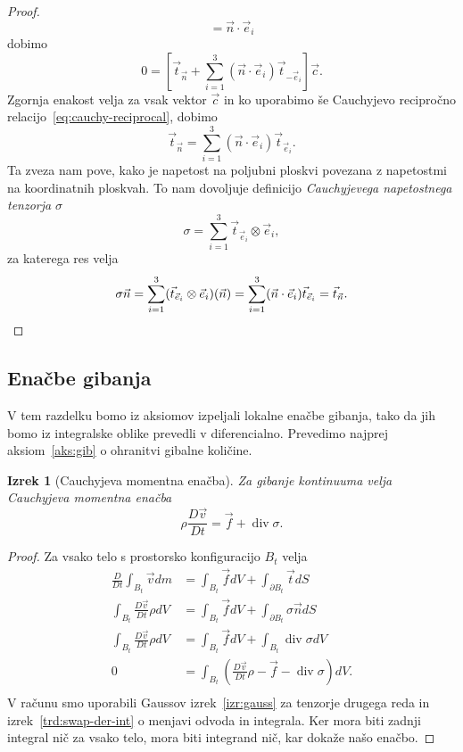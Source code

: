 \documentclass[12pt,a4paper,twoside]{article}
\theoremstyle{definition} %
\theoremstyle{plain} %
\newtheorem{izrek}[definicija]{Izrek}
\numberwithin{equation}{section}
\renewcommand{\div}{\operatorname{div}}
\newcommand{\DD}[2]{\ensuremath{\frac{D #1}{D #2}}}
\newcommand{\DDt}[1]{\DD{#1}{t}}
\newcommand{\vv}{\vec{v}}
\newcommand{\vt}{\vec{t}}
\newcommand{\vc}{\vec{c}}
\newcommand{\vn}{\vec{n}}
\newcommand{\vf}{\vec{f}}
\newcommand{\ts}{\sigma}
\begin{document}
\begin{proof}
\[  = \vn\cdot\vec{e}_i
\]
dobimo
\[
  0 = \left[\vt_{\vn} + \sum_{i=1}^3 (\vn \cdot\vec{e}_i) \vt_{-\vec{e}_i}\right]\vc.
\]
Zgornja enakost velja za vsak vektor $\vc$ in ko uporabimo še Cauchyjevo recipročno
relacijo~\eqref{eq:cauchy-reciprocal}, dobimo
\[
  \vt_{\vn} = \sum_{i=1}^3 (\vn \cdot\vec{e}_i) \vt_{\vec{e}_i}.
\]
Ta zveza nam pove, kako je napetost na poljubni ploskvi povezana z napetostmi na
koordinatnih ploskvah.
To nam dovoljuje definicijo \emph{Cauchyjevega napetostnega tenzorja}
$\ts$
\[
  \ts = \sum_{i=1}^3 \vt_{\vec{e}_i}\otimes \vec{e}_i,
\]
za katerega res velja
\[
  \ts\vn = \sum_{i=1}^3 (\vt_{\vec{e}_i}\otimes \vec{e}_i)(\vn) =
  \sum_{i=1}^3 (\vn \cdot\vec{e}_i) \vt_{\vec{e}_i} = \vt_{\vn}. \qedhere
\]
\end{proof}

\subsection{Enačbe gibanja}
V tem razdelku bomo iz aksiomov izpeljali lokalne enačbe gibanja, tako da jih
bomo iz integralske oblike prevedli v diferencialno.
Prevedimo najprej aksiom~\ref{aks:gib} o ohranitvi gibalne količine.
\begin{izrek}[Cauchyjeva momentna enačba]
  Za gibanje kontinuuma velja Cauchyjeva momentna enačba
  \begin{equation}
    \rho \DDt{\vv} = \vf + \div \sigma.
    \label{eq:cauchy-moment}
  \end{equation}
\end{izrek}
\begin{proof}
Za vsako telo s prostorsko konfiguracijo $B_t$ velja
\begin{align*}
  \DDt{} \int_{B_t} \vv dm &= \int_{B_t} \vf dV + \int_{\partial {B_t}} \vt dS \\
  \int_{B_t} \DDt{\vv}\rho dV &= \int_{B_t} \vf dV + \int_{\partial {B_t}} \ts \vn dS \\
  \int_{B_t} \DDt{\vv}\rho dV &= \int_{B_t} \vf dV + \int_{B_t} \div \ts dV \\
  0 &= \int_{B_t}\left(\DDt{\vv}\rho - \vf - \div \ts\right) dV. \\
\end{align*}
V računu smo uporabili Gaussov izrek~\ref{izr:gauss} za tenzorje drugega reda in
izrek~\ref{trd:swap-der-int} o menjavi odvoda in integrala. Ker mora biti zadnji
integral nič za vsako telo, mora biti integrand nič, kar dokaže našo enačbo.
\end{proof}
\end{document}
